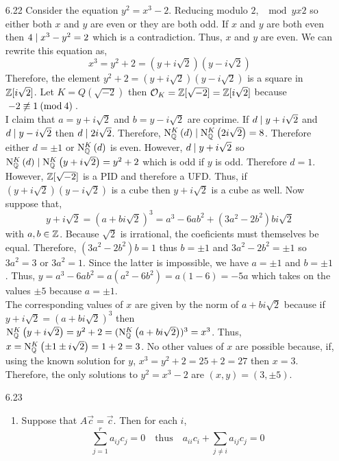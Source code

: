 \documentclass[12pt]{extarticle}
\begin{document}
 
\begin{enumerate}
\item[6.22]  Consider the equation $y^2 = x^3 - 2$. Reducing modulo $2$, $\mod{y}{x}{2}$ so either both $x$ and $y$ are even or they are both odd. If $x$ and $y$ are both even then $4 \mid x^3 - y^2 = 2$ which is a contradiction. Thus, $x$ and $y$ are even. We can rewrite this equation as,
\[x^3 = y^2 + 2 = (y + i \sqrt{2})(y - i \sqrt{2})\]
Therefore, the element $y^2 + 2 = (y + i \sqrt{2})(y - i \sqrt{2})$ is a square in $\mathbb{Z}[ i \sqrt{2}]$. Let $K = Q(\sqrt{-2})$ then $\mathcal{O}_{K} = \mathbb{Z}[\sqrt{-2}] = \mathbb{Z}[i \sqrt{2}]$ because $\nmod{-2}{1}{4}$. \bigskip \\ I claim that $a = y + i \sqrt{2}$ and $b = y - i \sqrt{2}$ are coprime. If $d \mid y + i \sqrt{2}$ and $d \mid y - i \sqrt{2}$ then $d \mid 2 i \sqrt{2}$. Therefore, $\mathrm{N}^{K}_{\mathbb{Q}}\left(d\right) \mid \mathrm{N}^{K}_{\mathbb{Q}}\left(2 i \sqrt{2}\right) = 8$. Therefore either $d = \pm 1$ or $\mathrm{N}^{K}_{\mathbb{Q}}\left(d\right)$ is even. However, $d \mid y + i \sqrt{2}$ so $\mathrm{N}^{K}_{\mathbb{Q}}\left(d\right) \mid \mathrm{N}^{K}_{\mathbb{Q}}\left(y + i \sqrt{2}\right) = y^2 + 2$ which is odd if $y$ is odd. Therefore $d = 1$. However, $\mathbb{Z}[\sqrt{-2}]$ is a PID and therefore a UFD. Thus, if $(y + i \sqrt{2})(y - i \sqrt{2})$ is a cube then $y + i \sqrt{2}$ is a cube as well. Now suppose that, 
\[y + i \sqrt{2} = (a + b i \sqrt{2})^3 = a^3 - 6ab^2 + (3a^2 - 2b^2) b i \sqrt{2} \]
with $a, b \in \mathbb{Z}$. Because $\sqrt{2}$ is irrational, the coeficients must themselves be equal. Therefore, $(3a^2 - 2 b^2)b = 1$ thus $b = \pm 1$ and $3a^2 - 2b^2 = \pm 1$ so $3a^2 = 3$ or $3a^2 = 1$. Since the latter is impossible, we have $a = \pm 1$ and $b = \pm 1$. Thus, $y = a^3 - 6ab^2 = a (a^2 - 6b^2) = a(1 - 6) = -5a$ which takes on the values $\pm 5$ because $a = \pm 1$. \bigskip \\ 
The corresponding values of $x$ are given by the norm of $a + b i \sqrt{2}$ because if $y + i \sqrt{2} = (a + b i \sqrt{2})^3$ then $\mathrm{N}^{K}_{\mathbb{Q}}\left(y + i \sqrt{2}\right) = y^2 + 2 = (\mathrm{N}^{K}_{\mathbb{Q}}\left(a + b i \sqrt{2}\right))^3 = x^3$. Thus, $x = \mathrm{N}^{K}_{\mathbb{Q}}\left(\pm 1 \pm i \sqrt{2}\right) = 1 + 2 = 3$. No other values of $x$ are possible because, if, using the known solution for $y$, $x^3 = y^2 + 2 = 25 + 2 = 27$ then $x = 3$. Therefore, the only solutions to $y^2 = x^3 - 2$ are $(x, y) = (3, \pm 5)$.  
\item[6.23]
\begin{enumerate}
\item Suppose that $A \vec{c} = \vec{c}$. Then for each $i$,
\[ \sum_{j = 1}^r a_{ij} c_j = 0 \quad \text{thus} \quad a_{ii} c_i + \sum_{j \neq i} a_{ij} c_j = 0\]

\end{enumerate}
\end{enumerate}
\end{document}
